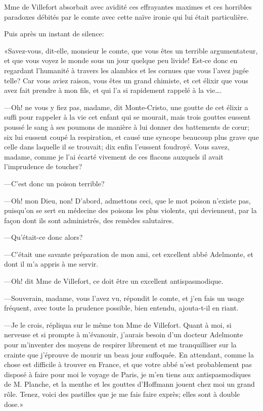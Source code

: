 Mme de Villefort absorbait avec avidité ces effrayantes maximes et ces horribles paradoxes débités par le comte avec cette naïve ironie qui lui était particulière. 

Puis après un instant de silence: 

«Savez-vous, dit-elle, monsieur le comte, que vous êtes un terrible argumentateur, et que vous voyez le monde sous un jour quelque peu livide! Est-ce donc en regardant l'humanité à travers les alambics et les cornues que vous l'avez jugée telle? Car vous aviez raison, vous êtes un grand chimiste, et cet élixir que vous avez fait prendre à mon fils, et qui l'a si rapidement rappelé à la vie\dots. 

—Oh! ne vous y fiez pas, madame, dit Monte-Cristo, une goutte de cet élixir a suffi pour rappeler à la vie cet enfant qui se mourait, mais trois gouttes eussent poussé le sang à ses poumons de manière à lui donner des battements de cœur; six lui eussent coupé la respiration, et causé une syncope beaucoup plus grave que celle dans laquelle il se trouvait; dix enfin l'eussent foudroyé. Vous savez, madame, comme je l'ai écarté vivement de ces flacons auxquels il avait l'imprudence de toucher? 

—C'est donc un poison terrible? 

—Oh! mon Dieu, non! D'abord, admettons ceci, que le mot poison n'existe pas, puisqu'on se sert en médecine des poisons les plus violents, qui deviennent, par la façon dont ils sont administrés, des remèdes salutaires. 

—Qu'était-ce donc alors? 

—C'était une savante préparation de mon ami, cet excellent abbé Adelmonte, et dont il m'a appris à me servir. 

—Oh! dit Mme de Villefort, ce doit être un excellent antispasmodique. 

—Souverain, madame, vous l'avez vu, répondit le comte, et j'en fais un usage fréquent, avec toute la prudence possible, bien entendu, ajouta-t-il en riant. 

—Je le crois, répliqua sur le même ton Mme de Villefort. Quant à moi, si nerveuse et si prompte à m'évanouir, j'aurais besoin d'un docteur Adelmonte pour m'inventer des moyens de respirer librement et me tranquilliser sur la crainte que j'éprouve de mourir un beau jour suffoquée. En attendant, comme la chose est difficile à trouver en France, et que votre abbé n'est probablement pas disposé à faire pour moi le voyage de Paris, je m'en tiens aux antispasmodiques de M. Planche, et la menthe et les gouttes d'Hoffmann jouent chez moi un grand rôle. Tenez, voici des pastilles que je me fais faire exprès; elles sont à double dose.» 

